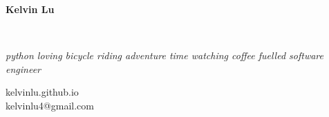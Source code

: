 \documentclass[letterpaper,10pt]{article}
\begin{document}

	\begin{minipage}[t]{0.65\textwidth}
		\begin{Huge}
			\colorbox{offwhite}{\color{cyan} \textbf{Kelvin Lu}}
		\end{Huge}
		\\
		\begin{footnotesize}
			\textit{python loving bicycle riding adventure time watching coffee fuelled software engineer}
		\end{footnotesize}
	\end{minipage}
	\begin{minipage}[t]{0.3\textwidth}
		\begin{flushright}
			kelvinlu.github.io \\
			kelvinlu4@gmail.com
		\end{flushright}
	\end{minipage}

	\vspace{0.5em}
	\vspace{0.5em}
\end{document}
